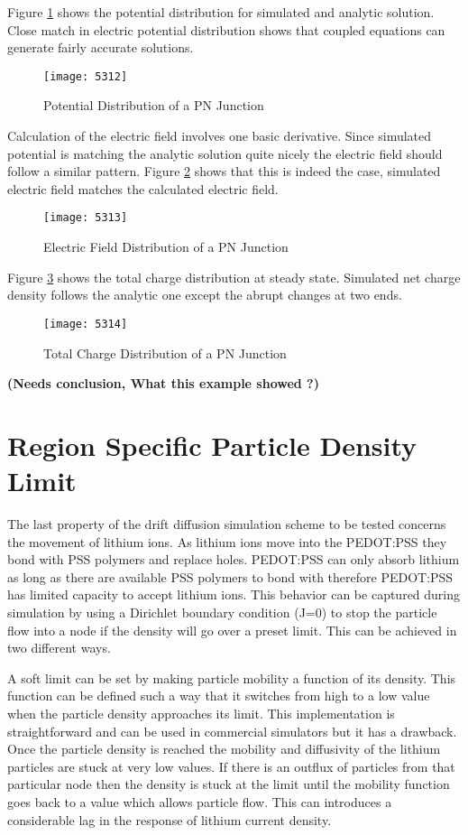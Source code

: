  Figure \ref{pnpot} shows the potential distribution for simulated and analytic solution. Close match in electric potential distribution shows that coupled equations can generate fairly accurate solutions.
 
\begin{figure}[!htp]
\centering
\texttt{[image: 5312]}
\caption{Potential Distribution of a PN Junction} 
\label{pnpot}
\end{figure}

Calculation of the electric field involves one basic derivative. Since simulated potential is matching the analytic solution quite nicely the electric field should follow a similar pattern. Figure \ref{pnefield} shows that this is indeed the case, simulated electric field matches the calculated electric field.
\begin{figure}[!htp]
\centering
\texttt{[image: 5313]}
\caption{Electric Field Distribution of a PN Junction} 
\label{pnefield}
\end{figure}

Figure \ref{pncd} shows the total charge distribution at steady state. Simulated net charge density follows the analytic one except the abrupt changes at two ends. 
\begin{figure}
\centering
\texttt{[image: 5314]}
\caption{Total Charge Distribution of a PN Junction} 
\label{pncd}
\end{figure}

\textbf{(Needs conclusion, What this example showed ?)}


\clearpage
\section{Region Specific Particle Density Limit}

The last property of the drift diffusion simulation scheme to be tested concerns the movement of lithium ions. As lithium ions move into the PEDOT:PSS they bond with PSS polymers and replace holes. PEDOT:PSS can only absorb lithium as long as there are available PSS polymers to bond with therefore PEDOT:PSS has limited capacity to accept lithium ions. This behavior can be captured during simulation by using a Dirichlet boundary condition (J=0) to stop the particle flow into a node if the density will go over a preset limit. This can be achieved in two different ways. 

A soft limit can be set by making particle mobility a function of its density. This function can be defined such a way that it switches from high to a low value when the particle density approaches its limit. This implementation is straightforward and can be used in commercial simulators but it has a drawback. Once the particle density is reached the mobility and diffusivity of the lithium particles are stuck at very low values. If there is an outflux of particles from that particular node then the density is stuck at the limit until the mobility function goes back to a value which allows particle flow. This can introduces a considerable lag in the response of lithium current density.  

